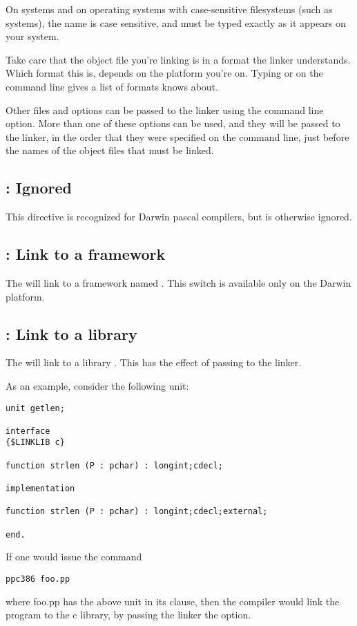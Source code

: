 On \linux systems and on operating systems with case-sensitive filesystems
(such as \unix systems), the name is case sensitive, and must be typed
exactly as it appears on your system.

\begin{remark}Take care that the object file you're linking is in a
format the linker understands. Which format this is, depends on the platform
you're on. Typing  or  on the command line gives a list of formats
 knows about.
\end{remark}

Other files and options can be passed to the linker using the 
command line option. More than one of these options can be used, and
they will be passed to the linker, in the order that they were specified on
the command line, just before the names of the object files that must be
linked.

\subsection{ : Ignored}
This directive is recognized for Darwin pascal compilers, but is otherwise
ignored.

\subsection{ : Link to a framework}
The  will link to a framework named
. This switch is available only on the Darwin platform.

\subsection{ : Link to a library}
\label{se:linklib}

The  will link to a library .
This has the effect of passing  to the linker.

As an example, consider the following unit:
\begin{verbatim}
unit getlen;

interface
{$LINKLIB c}

function strlen (P : pchar) : longint;cdecl;

implementation

function strlen (P : pchar) : longint;cdecl;external;

end.
\end{verbatim}
If one would issue the command
\begin{verbatim}
ppc386 foo.pp
\end{verbatim}
where foo.pp has the above unit in its  clause,
then the compiler would link the program to the c library, by passing the
linker the  option.

